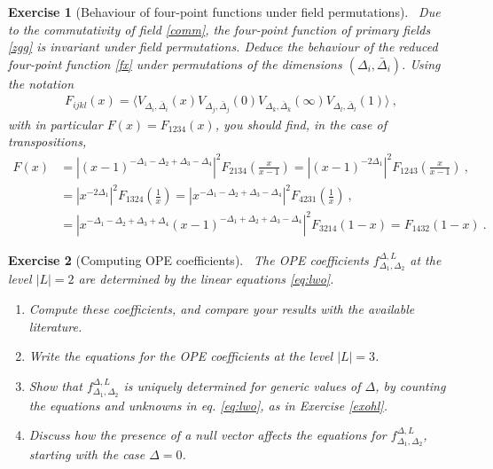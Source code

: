 \documentclass[12pt, a4paper, notitlepage, twoside]{report}
\numberwithin{equation}{section}
\theoremstyle{break}
\newtheorem{exo}{Exercise}[chapter]
\begin{document}
\begin{exo}[Behaviour of four-point functions under field permutations]
 ~\label{exoperm}
Due to the commutativity of field \eqref{comm}, the four-point function of primary fields \eqref{zgg} is invariant under field permutations. Deduce the behaviour of the reduced four-point function \eqref{fx} under permutations of the dimensions $(\Delta_i,\bar \Delta_i)$. Using the notation 
\begin{align}
 F_{ijkl}(x) =\Big\langle V_{\Delta_i,\bar\Delta_i}(x)V_{\Delta_j,\bar\Delta_j}(0)V_{\Delta_k,\bar\Delta_k}(\infty) V_{\Delta_l,\bar\Delta_l}(1)\Big\rangle \ ,
\end{align}
with in particular $F(x) = F_{1234}(x)$, you should find, in the case of transpositions, 
\begin{align}
 F(x) 
 &= \left|(x-1)^{-\Delta_1-\Delta_2+\Delta_3-\Delta_4}\right|^2 F_{2134}\left(\tfrac{x}{x-1}\right)
 =\left|(x-1)^{-2\Delta_1}\right|^2 F_{1243}\left(\tfrac{x}{x-1}\right)\ ,
 \label{ftotf}
 \\
 & = \left|x^{-2\Delta_1}\right|^2 F_{1324}\left(\tfrac{1}{x}\right) 
  = \left|x^{-\Delta_1-\Delta_2+\Delta_3-\Delta_4}\right|^2 F_{4231}\left(\tfrac{1}{x}\right) 
  \ ,
  \\
&  = \left|x^{-\Delta_1-\Delta_2+\Delta_3+\Delta_4}(x-1)^{-\Delta_1+\Delta_2+\Delta_3-\Delta_4}\right|^2 F_{3214}(1-x)
  = F_{1432}(1-x)\ .
\end{align}
\end{exo}


\begin{exo}[Computing OPE coefficients]
 ~\label{exohf}
The OPE coefficients $f^{\Delta,L}_{\Delta_1,\Delta_2}$ at the level $|L|= 2$ are determined by the linear equations \eqref{eq:lwo}.
\begin{enumerate}
 \item Compute these coefficients,
and compare your results with the available literature.
\item
Write the equations for the OPE coefficients at the level $|L|=3$. 
\item
Show that $f^{\Delta,L}_{\Delta_1,\Delta_2}$ is uniquely determined for generic values of $\Delta$, 
by counting the equations and unknowns in eq. \eqref{eq:lwo}, as in Exercise \ref{exohl}.
\item
Discuss how the presence of a null vector affects the equations for $f^{\Delta,L}_{\Delta_1,\Delta_2}$, starting with the case $\Delta=0$. 
\end{enumerate}
\end{exo}
\end{document}
